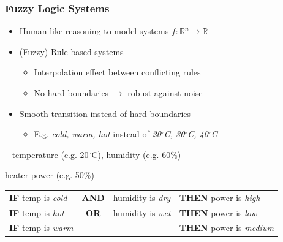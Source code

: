 \documentclass[
	10pt,
	t		%
]{beamer}
\begin{document}
\begin{frame}
	\frametitle{Fuzzy Logic Systems}
	
	\begin{itemize}
		\item Human-like reasoning to model systems $f: \mathbb{R}^n \rightarrow \mathbb{R}$
		\item (Fuzzy) Rule based systems
		      \begin{itemize}
			      \item Interpolation effect between conflicting rules
			      \item No hard boundaries $\rightarrow$ robust against noise
		      \end{itemize}
		\item Smooth transition instead of hard boundaries
		      \begin{itemize}
			      \item E.g. \textit{cold, warm, hot} instead of \textit{20$^{\circ}$C, 30$^{\circ}$C, 40$^{\circ}$C}
		      \end{itemize}
	\end{itemize}
	
	\vspace{0.4cm}
	
	\begin{example}[Heater Control]
		
		\begin{description}[wide=0]
			\item[\textbf{Input:}  ] ~ temperature (e.g. 20$^{\circ}$C), humidity (e.g. 60\%)
			\item[\textbf{Output:}] heater power (e.g. 50\%)
			\item[\textbf{Rules:}]
				{\footnotesize
				\begin{tabular}{lcll}
					\textbf{IF}  temp is \textit{cold} & \textbf{AND} & humidity is \textit{dry} & \textbf{THEN}  power is \textit{high}   \\
					\textbf{IF}  temp is \textit{hot}  & \textbf{OR}  & humidity is \textit{wet} & \textbf{THEN}  power is \textit{low}    \\
					\textbf{IF}  temp is \textit{warm} &              &                          & \textbf{THEN}  power is \textit{medium} \\
				\end{tabular} }
		\end{description}
	\end{example}
	
\end{frame}
\end{document}

